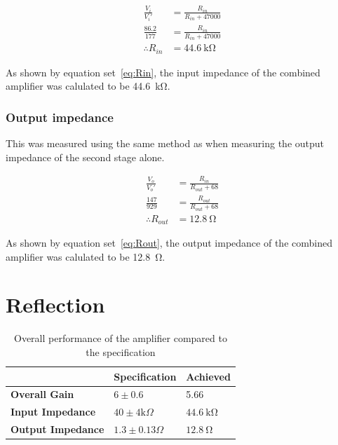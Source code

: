 \documentclass[a4paper,11pt]{article}
\begin{document}
            \begin{subequations} \label{eq:Rin}
            \begin{align}
                \frac{V_{i}}{V_{i}'} &= \frac{R_{in}}{R_{in} + 47000}   \\
                \frac{86.2}{177} &= \frac{R_{in}}{R_{in} + 47000}   \\
                \therefore R_{in} &= \SI{44.6}{\kilo\ohm}
            \end{align}
            \end{subequations}
            
            As shown by equation set~\ref{eq:Rin}, the input impedance of the combined amplifier was calulated to be \SI{44.6}{\kilo\ohm}.
            
        \subsubsection{Output impedance}
            This was measured using the same method as when measuring the output impedance of the second stage alone.
            
            \begin{subequations} \label{eq:Rout}
            \begin{align}
                \frac{V_{o}}{V_{o}'} &= \frac{R_{in}}{R_{out} + 68}   \\
                \frac{147}{929} &= \frac{R_{out}}{R_{out} + 68}   \\
                \therefore R_{out} &= \SI{12.8}{\ohm}
            \end{align}
            \end{subequations}
            
            As shown by equation set~\ref{eq:Rout}, the output impedance of the combined amplifier was calulated to be \SI{12.8}{\ohm}.

\newpage
\section{Reflection}
    \begin{table}[h]
    \centering
        \begin{tabular}{|l|l|l|}
            \hline
                                      & \textbf{Specification}          & \textbf{Achieved}         \\ \hline
            \textbf{Overall Gain}     & $6 \pm 0.6$                     & 5.66                      \\ \hline
            \textbf{Input Impedance}  & $40 \pm 4 \mathrm{k}\Omega$     & $\SI{44.6}{\kilo\ohm}$    \\ \hline
            \textbf{Output Impedance} & $1.3 \pm 0.13 \Omega$           & $\SI{12.8}{\ohm}$    \\ \hline
            \end{tabular}
    \caption{Overall performance of the amplifier compared to the specification}
    \label{tab:overall}
    \end{table}
    
\end{document}
